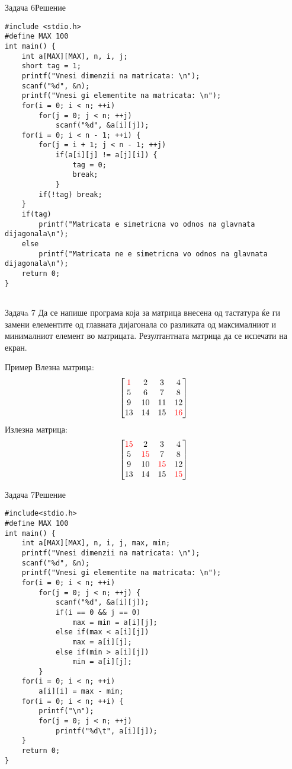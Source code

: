\begin{frame}[fragile]{Задача 6}{Решение} 
\begin{lstlisting}
#include <stdio.h>
#define MAX 100
int main() {
    int a[MAX][MAX], n, i, j;
    short tag = 1;
    printf("Vnesi dimenzii na matricata: \n");
    scanf("%d", &n);
    printf("Vnesi gi elementite na matricata: \n");
    for(i = 0; i < n; ++i)
        for(j = 0; j < n; ++j)
            scanf("%d", &a[i][j]);
    for(i = 0; i < n - 1; ++i) {
        for(j = i + 1; j < n - 1; ++j)
            if(a[i][j] != a[j][i]) {
                tag = 0;
                break;
            }
        if(!tag) break;
    }
    if(tag)
        printf("Matricata e simetricna vo odnos na glavnata dijagonala\n");
    else
        printf("Matricata ne e simetricna vo odnos na glavnata dijagonala\n");
    return 0;
}
    
\end{lstlisting}
\end{frame}

\begin{frame}[shrink = 10]{Задачa 7}
Да се напише програма која за матрица внесена од тастатура ќе ги замени елементите од главната дијагонала со разликата од максималниот и минималниот елемент во матрицата. Резултантната матрица да се испечати на екран.
\begin{exampleblock}{Пример}
Влезна матрица:\\
$$\begin{bmatrix}
{\color{red}1} & 2 & 3 & 4 \\ 5 & 6 & 7 & 8 \\ 9 & 10 & 11 & 12 \\ 13 & 14 & 15 & {\color{red}16}
\end{bmatrix}$$
Излезна матрица:\\
$$\begin{bmatrix}
{\color{red}15} & 2 & 3 & 4 \\ 5 & {\color{red}15} & 7 & 8 \\ 9 & 10 & {\color{red}15} & 12 \\ 13 & 14 & 15 & {\color{red}15}
\end{bmatrix}$$
\end{exampleblock}
\end{frame}


\begin{frame}[fragile]{Задача 7}{Решение} 
\begin{lstlisting}
#include<stdio.h>
#define MAX 100
int main() {
    int a[MAX][MAX], n, i, j, max, min;
    printf("Vnesi dimenzii na matricata: \n");
    scanf("%d", &n);
    printf("Vnesi gi elementite na matricata: \n");
    for(i = 0; i < n; ++i)
        for(j = 0; j < n; ++j) {
            scanf("%d", &a[i][j]);
            if(i == 0 && j == 0)
                max = min = a[i][j];
            else if(max < a[i][j])
                max = a[i][j];
            else if(min > a[i][j])
                min = a[i][j];
        }
    for(i = 0; i < n; ++i)
        a[i][i] = max - min;
    for(i = 0; i < n; ++i) {
        printf("\n");
        for(j = 0; j < n; ++j)
            printf("%d\t", a[i][j]);
    }
    return 0;
}
\end{lstlisting}
\end{frame}


